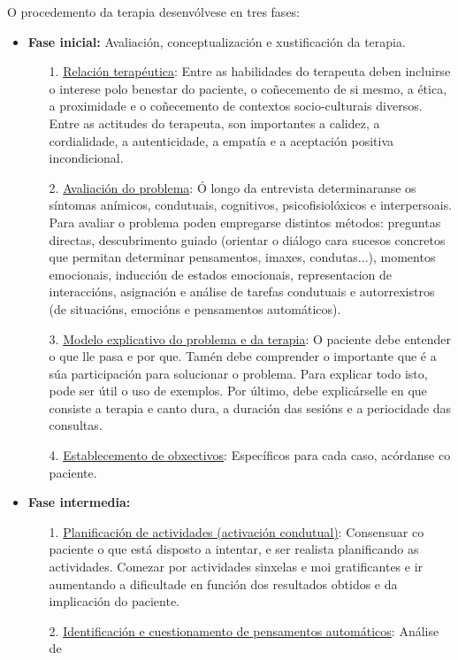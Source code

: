\documentclass[a4paper,11pt]{article}
\begin{document}
O procedemento da terapia desenvólvese en tres fases:
\begin{itemize}
	\item \textbf{Fase inicial:} Avaliación, conceptualización e xustificación da terapia.
	\begin{itemize}
		\item[1.] \underline{Relación terapéutica}: Entre as habilidades do terapeuta deben incluirse 
		o interese polo benestar do paciente, o coñecemento de si mesmo, a ética, a proximidade e o 
		coñecemento de contextos socio-culturais diversos. Entre as actitudes do terapeuta, son 
		importantes a calidez, a cordialidade, a autenticidade, a empatía e a aceptación positiva 
		incondicional.
		\item[2.] \underline{Avaliación do problema}: Ó longo da entrevista determinaranse os 
		síntomas anímicos, condutuais, cognitivos, psicofisiolóxicos e interpersoais. Para avaliar o 
		problema poden empregarse distintos métodos: preguntas directas, descubrimento guiado 
		(orientar o diálogo cara sucesos concretos que permitan determinar pensamentos, imaxes, 
		condutas...), momentos emocionais, inducción de estados emocionais, representacion de 
		interaccións, asignación e análise de tarefas condutuais e autorrexistros (de situacións, 
		emocións e pensamentos automáticos). 
		\item[3.] \underline{Modelo explicativo do problema e da terapia}: O paciente debe entender o 
		que lle pasa e por que. Tamén debe comprender o importante que é a súa participación para 
		solucionar o problema. Para explicar todo isto, pode ser útil o uso de exemplos. Por último, 
		debe explicárselle en que consiste a terapia e canto dura, a duración das sesións e a 
		periocidade das consultas. 
		\item[4.] \underline{Establecemento de obxectivos}: Específicos para cada caso, acórdanse co 
		paciente.
	\end{itemize}
	\item \textbf{Fase intermedia:} 
	\begin{itemize}
		\item[1.] \underline{Planificación de actividades (activación condutual)}: Consensuar co 
		paciente o que está disposto a intentar, e ser realista planificando as actividades. Comezar 
		por actividades sinxelas e moi gratificantes e ir aumentando a dificultade en función dos 
		resultados obtidos e da implicación do paciente.
		\item[2.] \underline{Identificación e cuestionamento de pensamentos automáticos}: Análise de 

\end{itemize}
\end{itemize}
\end{document}
